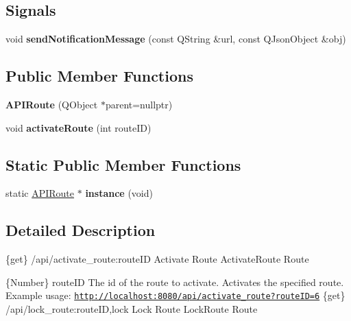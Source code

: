 \subsection*{Signals}
\begin{DoxyCompactItemize}
\item 
\mbox{\label{class_a_p_i_route_ad9db78abae10c20cbbec86378ba94db3}} 
void {\bfseries send\+Notification\+Message} (const Q\+String \&url, const Q\+Json\+Object \&obj)
\end{DoxyCompactItemize}
\subsection*{Public Member Functions}
\begin{DoxyCompactItemize}
\item 
\mbox{\label{class_a_p_i_route_ada8e5c770e397fc6ed6602bdbb670a29}} 
{\bfseries A\+P\+I\+Route} (Q\+Object $\ast$parent=nullptr)
\item 
\mbox{\label{class_a_p_i_route_ac110d1999b3afe409d6e341fb9ab06d6}} 
void {\bfseries activate\+Route} (int route\+ID)
\end{DoxyCompactItemize}
\subsection*{Static Public Member Functions}
\begin{DoxyCompactItemize}
\item 
\mbox{\label{class_a_p_i_route_af7d8f762fc9a692118fb222ab1aa89a3}} 
static \hyperlink{class_a_p_i_route}{A\+P\+I\+Route} $\ast$ {\bfseries instance} (void)
\end{DoxyCompactItemize}


\subsection{Detailed Description}
\{get\} /api/activate\+\_\+route\+:route\+ID Activate Route  Activate\+Route  Route

\{Number\} route\+ID The id of the route to activate.  Activates the specified route.  Example usage\+: \href{http://localhost:8080/api/activate_route?routeID=6}{\tt http\+://localhost\+:8080/api/activate\+\_\+route?route\+I\+D=6}  \{get\} /api/lock\+\_\+route\+:route\+ID,lock Lock Route  Lock\+Route  Route

